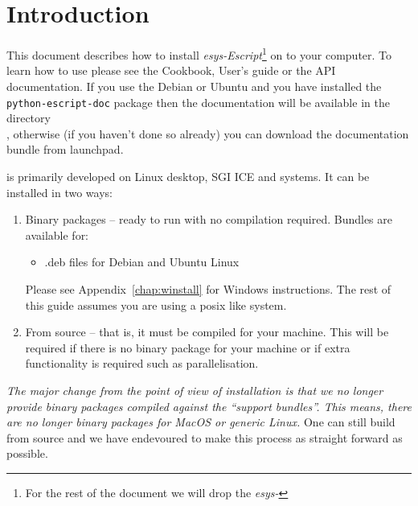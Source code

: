 %
%
%

\chapter{Introduction}
This document describes how to install \emph{esys-Escript}\footnote{For the rest of the document we will drop the \emph{esys-}} on to your computer.
To learn how to use \esfinley please see the Cookbook, User's guide or the API documentation.
If you use the Debian or Ubuntu and you have installed the \texttt{python-escript-doc} package then the documentation 
will be available in the directory\\
, otherwise (if you haven't done so already) you can download the documentation bundle 
from launchpad.



\esfinley is primarily developed on Linux desktop, SGI ICE and \macosx systems.
It can be installed in two ways:
\begin{enumerate}
  \item Binary packages -- ready to run with no compilation required.
      Bundles are available for:
      \begin{itemize}
	  \item .deb files for Debian and Ubuntu Linux
      \end{itemize}
    Please see Appendix~\ref{chap:winstall} for Windows instructions.
    The rest of this guide assumes you are using a posix like system.
  \item From source -- that is, it must be compiled for your machine.
  This will be required if there is no binary package 
    for your machine or if extra functionality is required such as \mpi parallelisation.
\end{enumerate}

\emph{The major change from the point of view of installation is that we no longer provide binary packages compiled
against the ``support bundles''.
This means, there are no longer binary packages for MacOS or generic Linux.
}
One can still build from source and we have endevoured to make this process as straight forward as possible.

